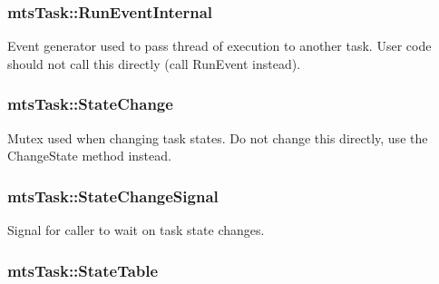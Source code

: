 \hypertarget{classmts_task_a8c40d935488c3bdba29f88bef9ee7809}{
\subsubsection[{Run\-Event\-Internal}]{ mts\-Task\-::\-Run\-Event\-Internal\hspace{0.3cm}{\ttfamily [protected]}}}\label{classmts_task_a8c40d935488c3bdba29f88bef9ee7809}
Event generator used to pass thread of execution to another task. User code should not call this directly (call Run\-Event instead). \hypertarget{classmts_task_abcc895b6d73ea813783da11440e2fe3a}{
\subsubsection[{State\-Change}]{ mts\-Task\-::\-State\-Change\hspace{0.3cm}{\ttfamily [protected]}}}\label{classmts_task_abcc895b6d73ea813783da11440e2fe3a}
Mutex used when changing task states. Do not change this directly, use the Change\-State method instead. \hypertarget{classmts_task_a49ee515de5a8a49d2c307ed429ce390f}{
\subsubsection[{State\-Change\-Signal}]{ mts\-Task\-::\-State\-Change\-Signal\hspace{0.3cm}{\ttfamily [protected]}}}\label{classmts_task_a49ee515de5a8a49d2c307ed429ce390f}
Signal for caller to wait on task state changes. \hypertarget{classmts_task_afef3935273a3dfe792b7d3beb6b3c4f1}{
\subsubsection[{State\-Table}]{ mts\-Task\-::\-State\-Table\hspace{0.3cm}{\ttfamily [protected]}}}\label{classmts_task_afef3935273a3dfe792b7d3beb6b3c4f1}
